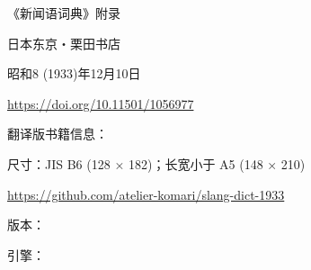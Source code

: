 
\maketitle



《新闻语词典》附录

日本东京・栗田书店

昭和8 (1933)年12月10日

\url{https://doi.org/10.11501/1056977}

\vspace*{\fill}

翻译版书籍信息：

尺寸：JIS B6 (128 × 182)；长宽小于 A5 (148 × 210)

\url{https://github.com/atelier-komari/slang-dict-1933}

版本：\gitversion

引擎：\luatexbanner

\clearpage
